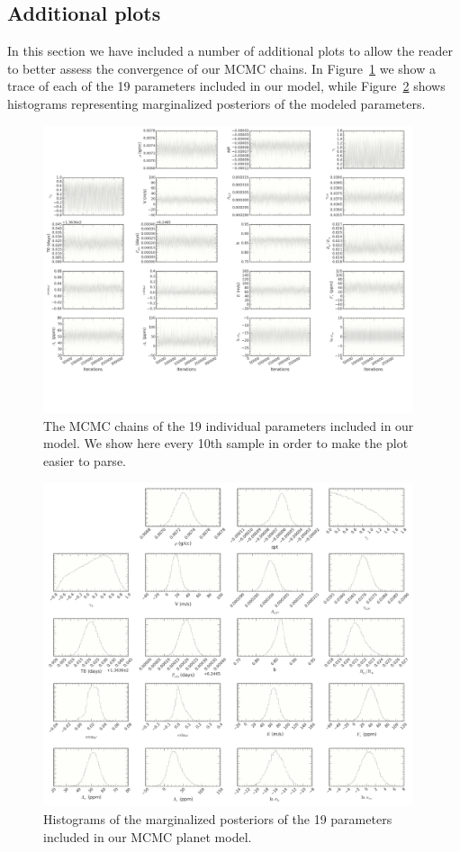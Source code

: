 \documentclass[apjl]{emulateapj}
\begin{document}
\begin{appendix}
\section{Additional plots}
In this section we have included a number of additional plots to allow the reader to better assess the convergence of our MCMC chains. In Figure~\ref{fig:chains} we show a trace of each of the 19 parameters included in our model, while Figure~\ref{fig:chain_hist} shows histograms representing marginalized posteriors of the modeled parameters.

\begin{figure}
\includegraphics[width=0.97\textwidth]{chains.pdf}
\caption{The MCMC chains of the 19 individual parameters included in our model. We show here every 10th sample in order to make the plot easier to parse.}
\label{fig:chains}
\end{figure}

\begin{figure}
\includegraphics[width=0.97\textwidth]{chain_hist.pdf}
\caption{Histograms of the marginalized posteriors of the 19 parameters included in our MCMC planet model.}
\label{fig:chain_hist}
\end{figure}






\end{appendix}
\end{document}
